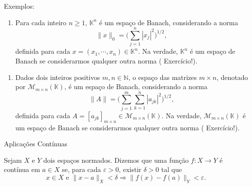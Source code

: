 \begin{frame}{Exemplos:}
    \begin{enumerate}[a]
        \item Para cada inteiro $n\geq 1$, $\mathbb K^n$ é um espaço de Banach, considerando a norma
        \[
        \displaystyle \|x\|_{0}=\bigg( \sum_{j=1}^{n} |x_j|^2\bigg)^{1/2},
        \]
        definida para cada $x=(x_1,\cdots ,x_n)\in \mathbb K^n$. Na verdade, $\mathbb K ^n$ é um espaço de Banach se considerarmos qualquer outra norma ({\color{red} Exercício!}).
    \end{enumerate}
\end{frame}
\begin{frame}
\begin{enumerate}[b]
\item Dados dois inteiros positivos $m,n\in \mathbb N$, o espaço das matrizes $m\times n$, denotado por $\mathcal M _{m\times n} (\mathbb K )$, é um espaço de Banach, considerando a norma
\[
\displaystyle \|A\|=\bigg( \sum_{j=1}^{m} \sum_{k=1}^{n}
|a_{jk}|^2\bigg)^{1/2},
\]
definida para cada $A=[a_{jk}]_{m\times n}\in \mathcal M _{m\times n} (\mathbb K )$. Na verdade, $\mathcal M _{m\times n} (\mathbb K )$ é um espaço de Banach se considerarmos qualquer outra norma ({\color{red} Exercício!}).        
\end{enumerate}    
\end{frame}
\begin{frame}{Aplicações Contínuas}
\begin{defin}
    Sejam $X$ e $Y$ dois espaços normados. Dizemos que uma função $f:X\longrightarrow Y$ é contínua em $a\in X$ se, para cada $\varepsilon >0$, existir $\delta >0$ tal que
\[
x\in X \text{ e } \|x-a\|_X <\delta \Longrightarrow \|f(x) - f(a)\|_Y < \varepsilon .
\]
\end{defin}
\end{frame}
